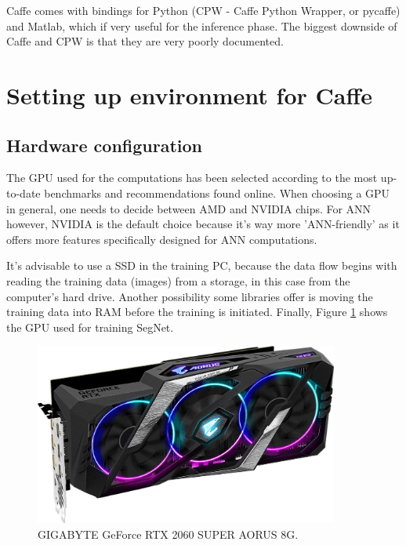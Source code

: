 Caffe comes with bindings for Python (CPW - Caffe Python Wrapper, or pycaffe) and Matlab, which if very useful for the inference phase. The biggest downside of Caffe and CPW is that they are very poorly documented.

\newpage
\section{Setting up environment for Caffe}

\subsection{Hardware configuration}

The GPU used for the computations has been selected according to the most up-to-date benchmarks and recommendations found online. When choosing a GPU in general, one needs to decide between AMD and NVIDIA chips. For ANN however, NVIDIA is the default choice because it's way more 'ANN-friendly' as it offers more features specifically designed for ANN computations. 

It's advisable to use a SSD in the training PC, because the data flow begins with reading the training data (images) from a storage, in this case from the computer's hard drive. Another possibility some libraries offer is moving the training data into RAM before the training is initiated. Finally, Figure \ref{grafika} shows the GPU used for training SegNet.

\vspace{5mm}
\begin{figure}[h]
	\begin{center}
		\includegraphics*[width=10cm, keepaspectratio]{obr/grafika.jpeg}
	\end{center}
	\vspace{4mm}
	\caption{GIGABYTE GeForce RTX 2060 SUPER AORUS 8G. \cite{gigabyte}} 
	\label{grafika}
\end{figure}  


